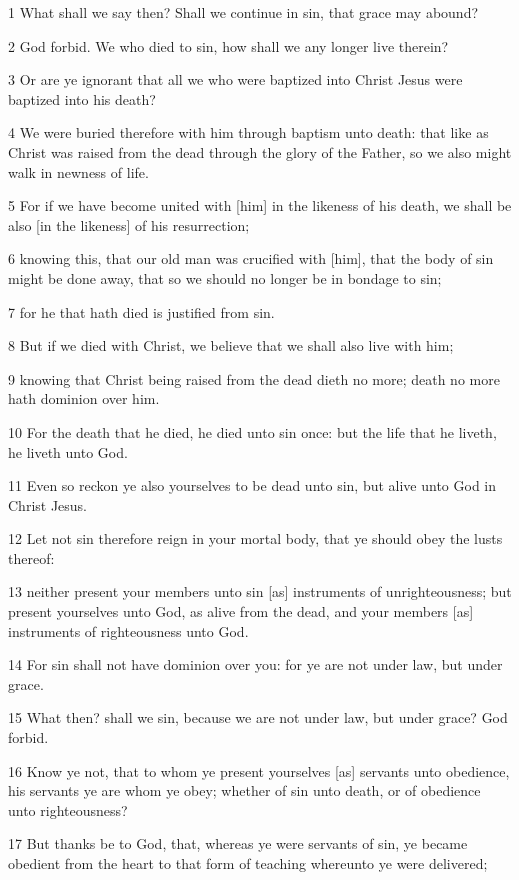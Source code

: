 \par 1 What shall we say then? Shall we continue in sin, that grace may abound?
\par 2 God forbid. We who died to sin, how shall we any longer live therein?
\par 3 Or are ye ignorant that all we who were baptized into Christ Jesus were baptized into his death?
\par 4 We were buried therefore with him through baptism unto death: that like as Christ was raised from the dead through the glory of the Father, so we also might walk in newness of life.
\par 5 For if we have become united with [him] in the likeness of his death, we shall be also [in the likeness] of his resurrection;
\par 6 knowing this, that our old man was crucified with [him], that the body of sin might be done away, that so we should no longer be in bondage to sin;
\par 7 for he that hath died is justified from sin.
\par 8 But if we died with Christ, we believe that we shall also live with him;
\par 9 knowing that Christ being raised from the dead dieth no more; death no more hath dominion over him.
\par 10 For the death that he died, he died unto sin once: but the life that he liveth, he liveth unto God.
\par 11 Even so reckon ye also yourselves to be dead unto sin, but alive unto God in Christ Jesus.
\par 12 Let not sin therefore reign in your mortal body, that ye should obey the lusts thereof:
\par 13 neither present your members unto sin [as] instruments of unrighteousness; but present yourselves unto God, as alive from the dead, and your members [as] instruments of righteousness unto God.
\par 14 For sin shall not have dominion over you: for ye are not under law, but under grace.
\par 15 What then? shall we sin, because we are not under law, but under grace? God forbid.
\par 16 Know ye not, that to whom ye present yourselves [as] servants unto obedience, his servants ye are whom ye obey; whether of sin unto death, or of obedience unto righteousness?
\par 17 But thanks be to God, that, whereas ye were servants of sin, ye became obedient from the heart to that form of teaching whereunto ye were delivered;

